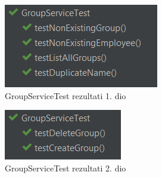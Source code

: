 				\begin{figure}[H] 					\centering 					                    \includegraphics[width=\textwidth]{Dokumentacija/ispit-komp/GroupServiceTestRez. dio.png}
				\caption{GroupServiceTest rezultati 1. dio}
				\end{figure}
				\begin{figure}[H] 					\centering 					                    \includegraphics[width=\textwidth]{Dokumentacija/ispit-komp/GroupServiceTestRez2.png}
				\caption{GroupServiceTest rezultati 2. dio}
				\end{figure}
				
				
				
